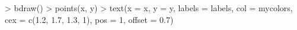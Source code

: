 \begin{Schunk}
\begin{Sinput}
> bdraw()
> points(x, y)
> text(x = x, y = y, labels = labels, col = mycolors, cex = c(1.2, 1.7, 1.3, 1), pos = 1, offset = 0.7)
\end{Sinput}
\end{Schunk}
